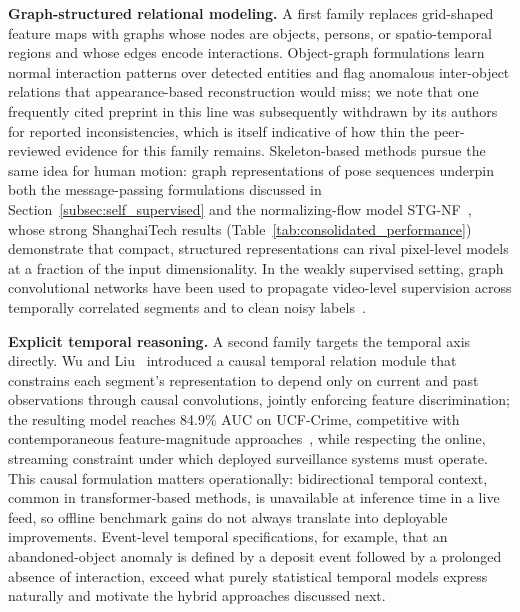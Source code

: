 \documentclass[10pt,a4paper]{article}
\begin{document}
\textbf{Graph-structured relational modeling.} A first family replaces grid-shaped feature maps with graphs whose nodes are objects, persons, or spatio-temporal regions and whose edges encode interactions. Object-graph formulations learn normal interaction patterns over detected entities and flag anomalous inter-object relations that appearance-based reconstruction would miss; we note that one frequently cited preprint in this line was subsequently withdrawn by its authors for reported inconsistencies, which is itself indicative of how thin the peer-reviewed evidence for this family remains. Skeleton-based methods pursue the same idea for human motion: graph representations of pose sequences underpin both the message-passing formulations discussed in Section~\ref{subsec:self_supervised} and the normalizing-flow model STG-NF~\citep{hirschorn2023normalizing}, whose strong ShanghaiTech results (Table~\ref{tab:consolidated_performance}) demonstrate that compact, structured representations can rival pixel-level models at a fraction of the input dimensionality. In the weakly supervised setting, graph convolutional networks have been used to propagate video-level supervision across temporally correlated segments and to clean noisy labels~\citep{zhong2019graph}.

\textbf{Explicit temporal reasoning.} A second family targets the temporal axis directly. Wu and Liu~\citeyearpar{wu2021causal} introduced a causal temporal relation module that constrains each segment's representation to depend only on current and past observations through causal convolutions, jointly enforcing feature discrimination; the resulting model reaches 84.9\% AUC on UCF-Crime, competitive with contemporaneous feature-magnitude approaches~\citep{tian2021weakly}, while respecting the online, streaming constraint under which deployed surveillance systems must operate. This causal formulation matters operationally: bidirectional temporal context, common in transformer-based methods, is unavailable at inference time in a live feed, so offline benchmark gains do not always translate into deployable improvements. Event-level temporal specifications, for example, that an abandoned-object anomaly is defined by a deposit event followed by a prolonged absence of interaction, exceed what purely statistical temporal models express naturally and motivate the hybrid approaches discussed next.
\end{document}
